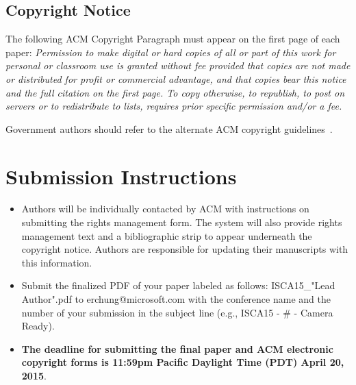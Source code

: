 \documentclass[final,nopageno]{jpaper}
\begin{document}
\subsection{Copyright Notice}
The following ACM Copyright Paragraph must appear on the first page of each
paper: \textit{Permission to make digital or hard copies of all or part of this work for
personal or classroom use is granted without fee provided that copies are not
made or distributed for profit or commercial advantage, and that copies bear
this notice and the full citation on the first page. To copy otherwise, to
republish, to post on servers or to redistribute to lists, requires prior
specific permission and/or a fee.}

Government authors should refer to the alternate ACM copyright guidelines~\cite{acm}.

\section{Submission Instructions}
\begin{itemize}
    \item Authors will be individually contacted by ACM with instructions on submitting the rights management form.  The system will also provide rights management text and a bibliographic strip to appear underneath the copyright notice. Authors are responsible for updating their manuscripts with this information.

    \item Submit the finalized PDF of your paper labeled as follows: ISCA15\_"Lead Author".pdf to erchung@microsoft.com with the conference name and the number of your submission in the subject line (e.g., ISCA15 - \# - Camera Ready).

    \item \textbf{The deadline for submitting the final paper and ACM electronic copyright forms is 11:59pm Pacific Daylight Time (PDT) April 20, 2015}.
\end{itemize}



\end{document}
